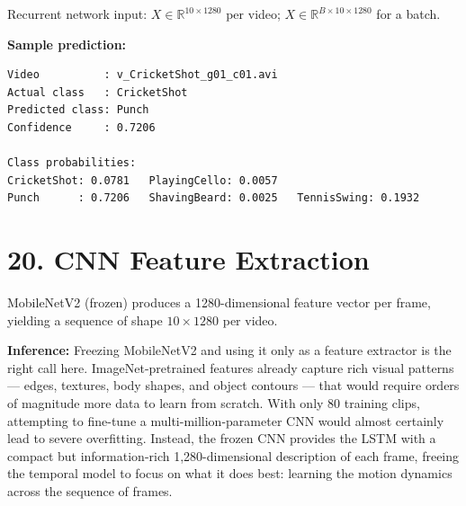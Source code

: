 \documentclass[10pt]{article}
\begin{document}
Recurrent network input: $X\in\mathbb{R}^{10\times1280}$ per video;
$X\in\mathbb{R}^{B\times10\times1280}$ for a batch.

\textbf{Sample prediction:}

\begin{verbatim}
Video          : v_CricketShot_g01_c01.avi
Actual class   : CricketShot
Predicted class: Punch
Confidence     : 0.7206

Class probabilities:
CricketShot: 0.0781   PlayingCello: 0.0057
Punch      : 0.7206   ShavingBeard: 0.0025   TennisSwing: 0.1932
\end{verbatim}

\section*{20. CNN Feature Extraction}

\begin{center}
\end{center}

MobileNetV2 (frozen) produces a 1280-dimensional feature vector per frame,
yielding a sequence of shape $10\times1280$ per video.

\textbf{Inference:}
Freezing MobileNetV2 and using it only as a feature extractor is the right
call here. ImageNet-pretrained features already capture rich visual patterns
--- edges, textures, body shapes, and object contours --- that would require
orders of magnitude more data to learn from scratch. With only 80 training
clips, attempting to fine-tune a multi-million-parameter CNN would almost
certainly lead to severe overfitting. Instead, the frozen CNN provides the
LSTM with a compact but information-rich 1,280-dimensional description of
each frame, freeing the temporal model to focus on what it does best:
learning the motion dynamics across the sequence of frames.
\end{document}
